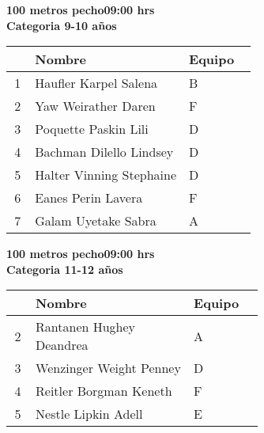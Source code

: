 \begin{minipage}{0.95\linewidth}\vspace{0.5cm} 
\begin{flushleft}
\textbf{
\hspace{-0.15cm}100 metros pecho\hspace{1.5cm}09:00 hrs \\Categoria 9-10 años}\vspace{-0.2cm} 
\end{flushleft}
\begin{tabular}{cp{0.63\linewidth}l}
\hline
& \textbf{Nombre} & \textbf{Equipo} \\ \hline
1 & Haufler Karpel Salena & B \\ 
2 & Yaw Weirather Daren & F \\ 
3 & Poquette Paskin Lili & D \\ 
4 & Bachman Dilello Lindsey & D \\ 
5 & Halter Vinning Stephaine & D \\ 
6 & Eanes Perin Lavera & F \\ 
7 & Galam Uyetake Sabra & A \\ 
\end{tabular}
\end{minipage}
\begin{minipage}{0.95\linewidth}\vspace{0.5cm} 
\begin{flushleft}
\textbf{
\hspace{-0.15cm}100 metros pecho\hspace{1.5cm}09:00 hrs \\Categoria 11-12 años}\vspace{-0.2cm} 
\end{flushleft}
\begin{tabular}{cp{0.63\linewidth}l}
\hline
& \textbf{Nombre} & \textbf{Equipo} \\ \hline
2 & Rantanen Hughey Deandrea & A \\ 
3 & Wenzinger Weight Penney & D \\ 
4 & Reitler Borgman Keneth & F \\ 
5 & Nestle Lipkin Adell & E \\ 
\end{tabular}
\end{minipage}

